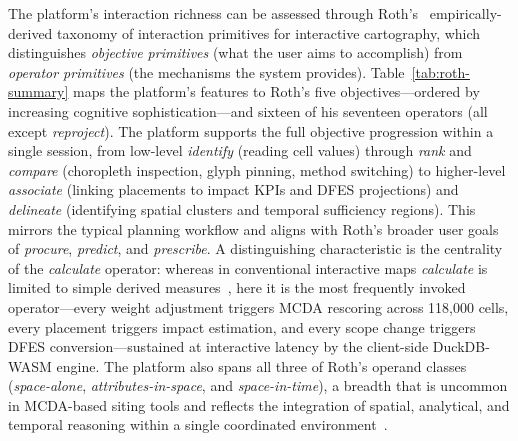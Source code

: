 The platform's interaction richness can be assessed through Roth's~\cite{roth2013taxonomy} empirically-derived taxonomy of interaction primitives for interactive cartography, which distinguishes \emph{objective primitives} (what the user aims to accomplish) from \emph{operator primitives} (the mechanisms the system provides). Table~\ref{tab:roth-summary} maps the platform's features to Roth's five objectives---ordered by increasing cognitive sophistication---and sixteen of his seventeen operators (all except \emph{reproject}). The platform supports the full objective progression within a single session, from low-level \emph{identify} (reading cell values) through \emph{rank} and \emph{compare} (choropleth inspection, glyph pinning, method switching) to higher-level \emph{associate} (linking placements to impact KPIs and DFES projections) and \emph{delineate} (identifying spatial clusters and temporal sufficiency regions). This mirrors the typical planning workflow and aligns with Roth's broader user goals of \emph{procure}, \emph{predict}, and \emph{prescribe}. A distinguishing characteristic is the centrality of the \emph{calculate} operator: whereas in conventional interactive maps \emph{calculate} is limited to simple derived measures~\cite{roth2013taxonomy}, here it is the most frequently invoked operator---every weight adjustment triggers MCDA rescoring across 118,000 cells, every placement triggers impact estimation, and every scope change triggers DFES conversion---sustained at interactive latency by the client-side DuckDB-WASM engine. The platform also spans all three of Roth's operand classes (\emph{space-alone}, \emph{attributes-in-space}, and \emph{space-in-time}), a breadth that is uncommon in MCDA-based siting tools and reflects the integration of spatial, analytical, and temporal reasoning within a single coordinated environment~\cite{keim2008visual}.

